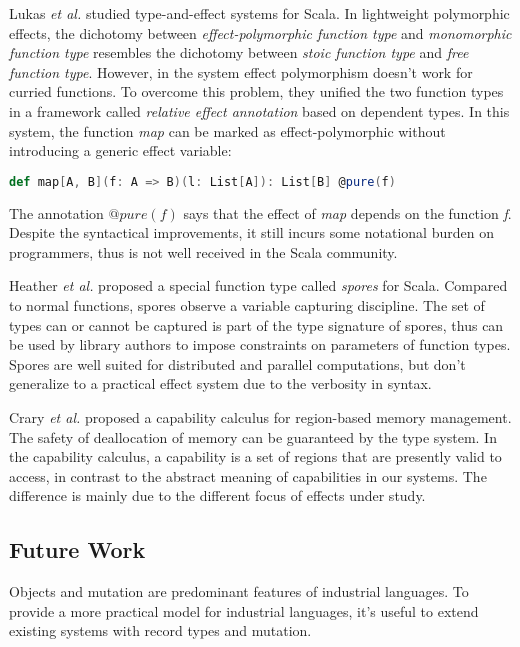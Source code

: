 Lukas \emph{et al.}  studied type-and-effect systems for
Scala\cite{rytz2012lightweight, rytz2013flow, lukas2014effect}.  In
lightweight polymorphic effects\cite{rytz2012lightweight}, the
dichotomy between \emph{effect-polymorphic function type} and
\emph{monomorphic function type} resembles the dichotomy between
\emph{stoic function type} and \emph{free function type}. However, in
the system effect polymorphism doesn't work for curried functions. To
overcome this problem, they unified the two function types in a
framework called \emph{relative effect annotation} based on dependent
types. In this system, the function \emph{map} can be marked as
effect-polymorphic without introducing a generic effect variable:

\begin{lstlisting}[language=Scala]
def map[A, B](f: A => B)(l: List[A]): List[B] @pure(f)
\end{lstlisting}

The annotation $@pure(f)$ says that the effect of \emph{map} depends
on the function \emph{f}. Despite the syntactical improvements, it
still incurs some notational burden on programmers, thus is not well
received in the Scala community.

Heather \emph{et al.} proposed a special function type called
\emph{spores} for Scala\cite{miller2014spores}. Compared to normal
functions, spores observe a variable capturing discipline. The set of
types can or cannot be captured is part of the type signature of
spores, thus can be used by library authors to impose constraints on
parameters of function types. Spores are well suited for distributed
and parallel computations, but don't generalize to a practical effect
system due to the verbosity in syntax.

Crary \emph{et al.} proposed a capability calculus for region-based
memory management\cite{crary1999typed}. The safety of deallocation of
memory can be guaranteed by the type system. In the capability
calculus, a capability is a set of regions that are presently valid to
access, in contrast to the abstract meaning of capabilities in our
systems. The difference is mainly due to the different focus of
effects under study.

\subsection{Future Work}

Objects and mutation are predominant features of industrial
languages. To provide a more practical model for industrial languages,
it's useful to extend existing systems with record types and mutation.

